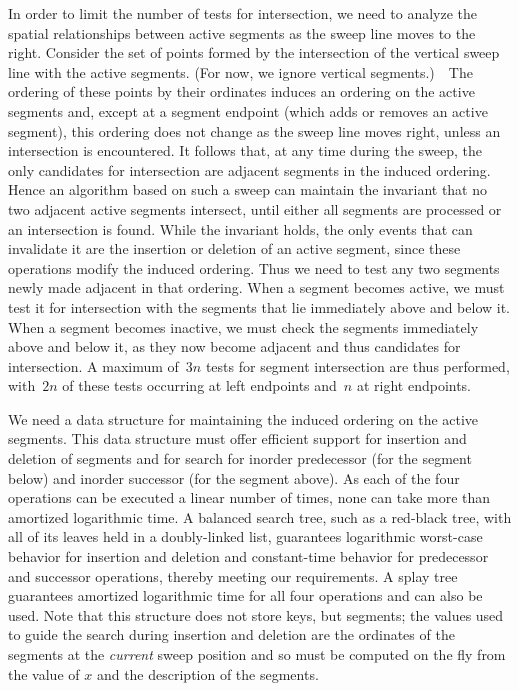 \documentclass[11pt]{article}
\begin{document}
In order to limit the number of tests for intersection, we need to analyze the
spatial relationships between active segments as the sweep line moves to the
right.  Consider the set of points formed by the intersection of the vertical
sweep line with the active segments.  (For now, we ignore vertical segments.)\
\ The ordering of these points by their ordinates induces an ordering on the
active segments and, except at a segment endpoint (which adds or removes an
active segment), this ordering does not change as the sweep line moves right,
unless an intersection is encountered.  It follows that, at any time during the
sweep, the only candidates for intersection are adjacent segments in the
induced ordering.  Hence an algorithm based on such a sweep can maintain the
invariant that no two adjacent active segments intersect, until either all
segments are processed or an intersection is found.  While the invariant holds,
the only events that can invalidate it are the insertion or deletion of an
active segment, since these operations modify the induced ordering.  Thus we
need to test any two segments newly made adjacent in that ordering.  When a
segment becomes active, we must test it for intersection with the segments that
lie immediately above and below it.  When a segment becomes inactive, we must
check the segments immediately above and below it, as they now become adjacent
and thus candidates for intersection.  A maximum of~$3n$ tests for segment
intersection are thus performed, with~$2n$ of these tests occurring at left
endpoints and~$n$ at right endpoints.

We need a data structure for maintaining the induced ordering on the active
segments.  This data structure must offer efficient support for insertion and
deletion of segments and for search for inorder predecessor (for the segment
below) and inorder successor (for the segment above).  As each of the four
operations can be executed a linear number of times, none can take more than
amortized logarithmic time.  A balanced search tree, such as a red-black tree,
with all of its leaves held in a doubly-linked list, guarantees logarithmic
worst-case behavior for insertion and deletion and constant-time behavior for
predecessor and successor operations, thereby meeting our requirements.  A
splay tree guarantees amortized logarithmic time for all four operations and
can also be used.  Note that this structure does not store keys, but segments;
the values used to guide the search during insertion and deletion are the
ordinates of the segments at the \emph{current} sweep position and so must be
computed on the fly from the value of $x$ and the description of the segments.
\end{document}
